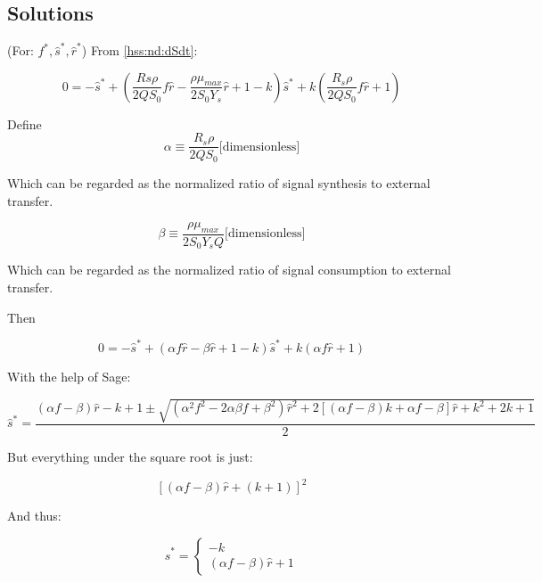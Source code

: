 \documentclass[11pt]{amsart}
\begin{document}
		\subsection{Solutions}
			\begin{flushleft}
				(For: \(f^*,\hat{s}^*,\hat{r}^*\))
				From \ref{hss:nd:dSdt}:
				
				\begin{equation}
					0 = -\hat{s}^* + (\frac{Rs\rho}{2QS_0}f\hat{r}
						- \frac{\rho\mu_{max}}{2S_0Y_s}\hat{r} + 1 - k)\hat{s}^*
						+ k(\frac{R_s\rho}{2QS_0}f\hat{r} + 1)				
				\end{equation}
				
				Define
				\[\alpha \equiv \frac{R_s\rho}{2QS_0} \textrm{[dimensionless]}\]
				
				Which can be regarded as the normalized ratio of signal synthesis to external transfer.
				
				\[\beta \equiv \frac{\rho\mu_{max}}{2S_0Y_sQ} \textrm{[dimensionless]}\]
				
				Which can be regarded as the normalized ratio of signal consumption to external transfer.
				
				Then
				
				\begin{equation}
					0 = -\hat{s}^* + (\alpha f\hat{r} - \beta\hat{r} + 1 - k)\hat{s}^* + k(\alpha f\hat{r} + 1)
				\end{equation}
				
				With the help of Sage:
				
				\begin{equation}
					\hat{s}^* = \frac{(\alpha f - \beta)\hat{r}
						 - k
						 + 1
						 \pm \sqrt{
						 	(\alpha^2f^2 - 2\alpha\beta f + \beta^2)\hat{r}^2
							+ 2[(\alpha f - \beta)k + \alpha f - \beta]\hat{r}
							+ k^2 + 2k + 1
						}}{2}
				\end{equation}
				
				But everything under the square root is just:
				
				\[ [(\alpha f - \beta)\hat{r} + (k + 1)]^2 \]
				
				And thus:
				
				\begin{equation}
					\hat{s}^* = 
						\begin{cases}
							-k \\
							(\alpha f - \beta)\hat{r} + 1
						\end{cases}			
				\end{equation}
				

\end{flushleft}
\end{document}
